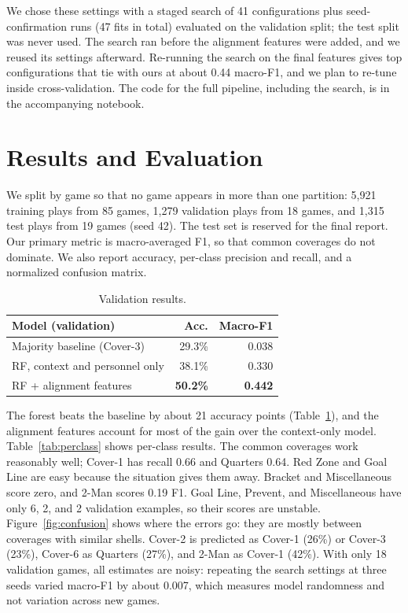 \documentclass[11pt]{article}
\begin{document}
We chose these settings with a staged search of 41 configurations plus seed-confirmation runs (47 fits in total) evaluated on the validation split; the test split was never used. The search ran before the alignment features were added, and we reused its settings afterward. Re-running the search on the final features gives top configurations that tie with ours at about 0.44 macro-F1, and we plan to re-tune inside cross-validation. The code for the full pipeline, including the search, is in the accompanying notebook.

\section{Results and Evaluation}

We split by game so that no game appears in more than one partition: 5,921 training plays from 85 games, 1,279 validation plays from 18 games, and 1,315 test plays from 19 games (seed 42). The test set is reserved for the final report. Our primary metric is macro-averaged F1, so that common coverages do not dominate. We also report accuracy, per-class precision and recall, and a normalized confusion matrix.

\begin{table}[t]
  \centering
  \small
  \begin{tabular}{lrr}
    \hline
    \textbf{Model (validation)} & \textbf{Acc.} & \textbf{Macro-F1} \\
    \hline
    Majority baseline (Cover-3)        & 29.3\% & 0.038 \\
    RF, context and personnel only     & 38.1\% & 0.330 \\
    RF + alignment features            & \textbf{50.2\%} & \textbf{0.442} \\
    \hline
  \end{tabular}
  \caption{\label{tab:results}Validation results.}
\end{table}

The forest beats the baseline by about 21 accuracy points (Table~\ref{tab:results}), and the alignment features account for most of the gain over the context-only model. Table~\ref{tab:perclass} shows per-class results. The common coverages work reasonably well; Cover-1 has recall 0.66 and Quarters 0.64. Red Zone and Goal Line are easy because the situation gives them away. Bracket and Miscellaneous score zero, and 2-Man scores 0.19 F1. Goal Line, Prevent, and Miscellaneous have only 6, 2, and 2 validation examples, so their scores are unstable. Figure~\ref{fig:confusion} shows where the errors go: they are mostly between coverages with similar shells. Cover-2 is predicted as Cover-1 (26\%) or Cover-3 (23\%), Cover-6 as Quarters (27\%), and 2-Man as Cover-1 (42\%). With only 18 validation games, all estimates are noisy: repeating the search settings at three seeds varied macro-F1 by about 0.007, which measures model randomness and not variation across new games.
\end{document}
